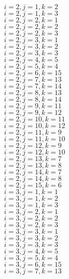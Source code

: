 \documentclass[14pt]{article}
\begin{document}
    $i=2,j=1,k=2 $ \\ 
    $i=2,j=1,k=3 $ \\ 
    $i=2,j=2,k=1 $ \\ 
    $i=2,j=2,k=2 $ \\ 
    $i=2,j=2,k=3 $ \\ 
    $i=2,j=3,k=1 $ \\ 
    $i=2,j=3,k=2 $ \\ 
    $i=2,j=3,k=3 $ \\ 
    $i=2,j=4,k=5 $ \\ 
    $i=2,j=5,k=4 $ \\ 
    $i=2,j=6,k=15 $ \\ 
    $i=2,j=7,k=13 $ \\ 
    $i=2,j=7,k=14 $ \\ 
    $i=2,j=8,k=13 $ \\ 
    $i=2,j=8,k=14 $ \\ 
    $i=2,j=9,k=11 $ \\ 
    $i=2,j=9,k=12 $ \\ 
    $i=2,j=10,k=11 $ \\ 
    $i=2,j=10,k=12 $ \\ 
    $i=2,j=11,k=9 $ \\ 
    $i=2,j=11,k=10 $ \\ 
    $i=2,j=12,k=9 $ \\ 
    $i=2,j=12,k=10 $ \\ 
    $i=2,j=13,k=7 $ \\ 
    $i=2,j=13,k=8 $ \\ 
    $i=2,j=14,k=7 $ \\ 
    $i=2,j=14,k=8 $ \\ 
    $i=2,j=15,k=6 $ \\ 
    $i=3,j=1,k=1 $ \\ 
    $i=3,j=1,k=2 $ \\ 
    $i=3,j=1,k=3 $ \\ 
    $i=3,j=2,k=1 $ \\ 
    $i=3,j=2,k=2 $ \\ 
    $i=3,j=2,k=3 $ \\ 
    $i=3,j=3,k=1 $ \\ 
    $i=3,j=3,k=2 $ \\ 
    $i=3,j=3,k=3 $ \\ 
    $i=3,j=4,k=5 $ \\ 
    $i=3,j=5,k=4 $ \\ 
    $i=3,j=6,k=15 $ \\ 
    $i=3,j=7,k=13 $ \\ 
\end{document}
